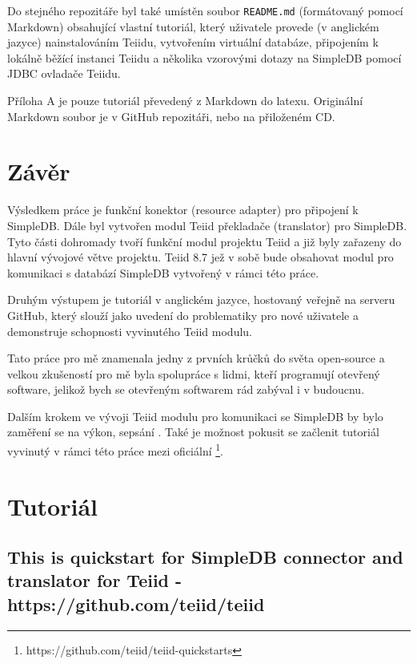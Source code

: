 \documentclass[oneside,12pt,final]{fithesis2}
\begin{document}
Do stejného repozitáře byl také umístěn soubor \texttt{README.md} (formátovaný pomocí Markdown) obsahující vlastní tutoriál, který uživatele provede (v anglickém jazyce) nainstalováním Teiidu, vytvořením virtuální databáze, připojením k lokálně běžící instanci Teiidu a několika vzorovými dotazy na SimpleDB pomocí JDBC ovladače Teiidu.

Příloha A je pouze tutoriál převedený z Markdown do latexu. Originální Markdown soubor je v GitHub repozitáři, nebo na přiloženém CD.
\chapter{Závěr}
Výsledkem práce je funkční konektor (resource adapter) pro připojení k SimpleDB. Dále byl vytvořen modul Teiid překladače (translator) pro SimpleDB. Tyto části dohromady tvoří funkční modul projektu Teiid a již byly zařazeny do hlavní vývojové větve projektu. Teiid 8.7 jež v sobě bude obsahovat modul pro komunikaci s databází SimpleDB vytvořený v rámci této práce.

Druhým výstupem je tutoriál v anglickém jazyce, hostovaný veřejně na serveru GitHub, který slouží jako uvedení do problematiky pro nové uživatele a demonstruje schopnosti vyvinutého Teiid modulu.

Tato práce pro mě znamenala jedny z prvních krůčků do světa open-source a velkou zkušeností pro mě byla spolupráce s lidmi, kteří programují otevřený software, jelikož bych se otevřeným softwarem rád zabýval i v budoucnu.

Dalším krokem ve vývoji Teiid modulu pro komunikaci se SimpleDB by bylo zaměření se na výkon, sepsání . Také je možnost pokusit se začlenit tutoriál vyvinutý v rámci této práce mezi oficiální \footnote{https://github.com/teiid/teiid-quickstarts}.
\nocite{*}

\appendix
\chapter{Tutoriál}
\section*{This is quickstart for SimpleDB connector and translator for Teiid - https://github.com/teiid/teiid}
\end{document}
